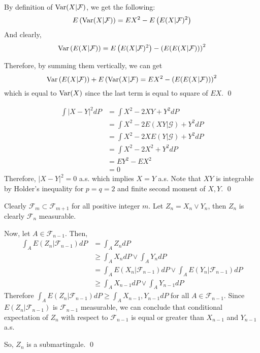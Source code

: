 \begin{problem}[4.1.7] \hfill

	By definition of $\operatorname{Var} (X | \mathcal{F})$, we get the following:
\[
	E \left( \operatorname{Var} (X | \mathcal{F} ) \right) = EX^2 - E\left( E(X|\mathcal{F})^2 \right)
\]
	And clearly,
\[
	\operatorname{Var} \left( E(X|\mathcal{F}) \right) = E\left( E(X|\mathcal{F})^2 \right) - \left( E( E(X|\mathcal{F}) ) \right)^2
\]

Therefore, by summing them vertically, we can get
\[
	\operatorname{Var} \left( E(X|\mathcal{F}) \right) + E\left( \operatorname{Var}(X|\mathcal{F} \right) = EX^2 - \left( E(E(X|\mathcal{F})) \right)^2
\]
which is equal to $\operatorname{Var}(X)$ since the last term is equal to square of $EX$.
\qed
\end{problem}

\begin{problem}[4.1.9] \hfill
\[
	\begin{split}
		\int |X-Y|^2 dP
		& = \int X^2 - 2XY + Y^2 dP \\
		& = \int X^2 - 2E(XY | \mathcal{G}) +Y^2 dP \\
		& = \int X^2 -2X E(Y|\mathcal{G}) +Y^2 dP \\
		& = \int X^2 - 2X^2 + Y^2 dP \\
		& = EY^2 - EX^2 \\
		& = 0
	\end{split}
\]
Therefore, $|X-Y|^2 = 0$ a.s. which implies $X = Y$ a.s.
Note that $XY$ is integrable by Holder's inequality for $p = q = 2$ and finite second moment of $X, Y$.
\qed
\end{problem}

\begin{problem}[4.2.3] \hfill

	Clearly $\mathcal{F}_m \subset \mathcal{F}_{m+1}$ for all positive integer $m$.
	Let $Z_n = X_n \vee Y_n$, then $Z_n$ is clearly $\mathcal{F}_n$ measurable.
	
	Now, let $A \in \mathcal{F}_{n-1}$. Then,
\[
	\begin{split}
		\int_A E(Z_n | \mathcal{F}_{n-1}) dP
		& = \int_A Z_n dP \\
		& \geq \int_A X_n dP \vee \int_A Y_n dP \\ 
		& = \int_A E(X_n | \mathcal{F}_{n-1})dP \vee \int_A E(Y_n | \mathcal{F}_{n-1}) dP \\
		& \geq \int_A X_{n-1} dP \vee \int_A Y_{n-1} dP
	\end{split}
\]
Therefore $\int_A E(Z_n | \mathcal{F}_{n-1}) dP \geq \int_A X_{n-1}, Y_{n-1} dP$ for all $A \in \mathcal{F}_{n-1}$.
Since $E(Z_n | \mathcal{F}_{n-1})$ is $\mathcal{F}_{n-1}$ measurable, we can conclude that conditional expectation of $Z_n$ with respect to $\mathcal{F}_{n-1}$ is equal or greater than $X_{n-1}$ and $Y_{n-1}$ a.s.

So, $Z_n$ is a submartingale.
\qed
\end{problem}

